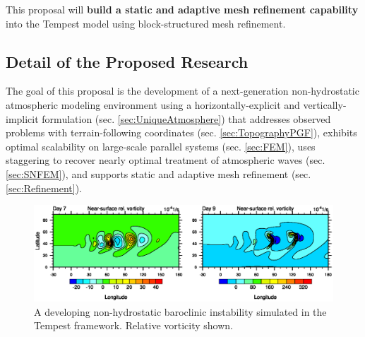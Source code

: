 \documentclass[11pt]{article}
\begin{document}
This proposal will \textbf{build a static and adaptive mesh refinement capability} into the Tempest model using block-structured mesh refinement.





\subsection{Detail of the Proposed Research} \label{sec:Research}

The goal of this proposal is the development of a next-generation non-hydrostatic atmospheric modeling environment using a horizontally-explicit and vertically-implicit formulation (sec. \ref{sec:UniqueAtmosphere}) that addresses observed problems with terrain-following coordinates (sec. \ref{sec:TopographyPGF}), exhibits optimal scalability on large-scale parallel systems (sec. \ref{sec:FEM}), uses staggering to recover nearly optimal treatment of atmospheric waves (sec. \ref{sec:SNFEM}), and supports static and adaptive mesh refinement (sec. \ref{sec:Refinement}).

\begin{figure}
\begin{center}
\includegraphics[width=6in]{UMJSTest-Results}
\end{center}
\caption{A developing non-hydrostatic baroclinic instability simulated in the Tempest framework.  Relative vorticity shown.} \label{fig:TempestBaroclinicInstability}
\end{figure}
\end{document}

